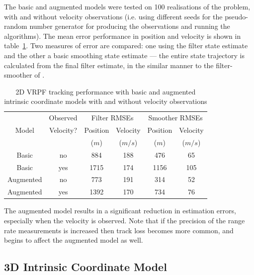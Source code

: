 \documentclass[conference]{IEEEtran}
\begin{document}
The basic and augmented models were tested on 100 realisations of the problem, with and without velocity observations (i.e. using different seeds for the pseudo-random number generator for producing the observations and running the algorithms). The mean error performance in position and velocity is shown in table~\ref{tab:2D_performance}. Two measures of error are compared: one using the filter state estimate and the other a basic smoothing state estimate --- the entire state trajectory is calculated from the final filter estimate, in the similar manner to the filter-smoother of \cite{Kitagawa1996}.
%
\begin{table}
\renewcommand{\arraystretch}{1.3}
\caption{2D VRPF tracking performance with basic and augmented intrinsic coordinate models with and without velocity observations}
\label{tab:2D_performance}
\centering
\begin{tabular}{|c|c|c|c|c|c|}
\hline
      & Observed  & \multicolumn{2}{c|}{Filter RMSEs}  & \multicolumn{2}{c|}{Smoother RMSEs}  \\
Model & Velocity? & Position & Velocity                & Position & Velocity                  \\
      &           & ($m$)    & ($m/s$)                 & ($m$)    & ($m/s$)                   \\
\hline
Basic     & no  & 884  & 188 & 476  & 65 \\
Basic     & yes & 1715 & 174 & 1156 & 105 \\
\hline
Augmented & no  & 773  & 191 & 314  & 52 \\
Augmented & yes & 1392 & 170 & 734  & 76  \\
\hline
\end{tabular}
\end{table}

The augmented model results in a significant reduction in estimation errors, especially when the velocity is observed. Note that if the precision of the range rate measurements is increased then track loss becomes more common, and begins to affect the augmented model as well.



\subsection{3D Intrinsic Coordinate Model}
\end{document}
